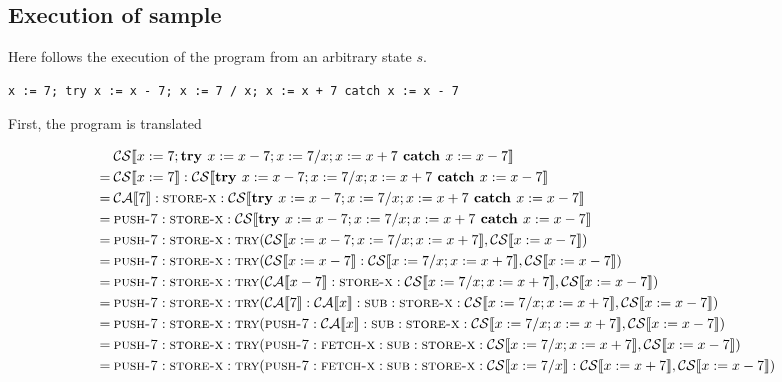 \documentclass[11pt,oneside,a4paper]{article}
\newenvironment{changemargin}[2]{%
\begin{list}{}{%
\setlength{\topsep}{0pt}%
\setlength{\leftmargin}{#1}%
\setlength{\listparindent}{\parindent}%
\setlength{\itemindent}{\parindent}%
\setlength{\parsep}{\parskip}%
}%
\item[]}{\end{list}}
\newcommand{\SExp}[2]{\mathcal{#1}\llbracket #2 \rrbracket}
\newcommand{\AMIns}[1]{\textsc{#1}}
\begin{document}
\subsection*{Execution of sample}
Here follows the execution of the program from an arbitrary 
state \(s\).
\begin{verbatim}
x := 7; try x := x - 7; x := 7 / x; x := x + 7 catch x := x - 7
\end{verbatim}
First, the program is translated
\begin{changemargin}{-2.9cm}{\rightmargin}
\begin{align*}
&\SExp{CS}{x := 7; \textbf{try } x := x - 7; x := 7 / x; x := x + 7 
\textbf{ catch } x := x - 7}  \\
=\: &\SExp{CS}{x := 7}:\SExp{CS}{\textbf{try } x := x - 7; x := 7 / x; x := x + 7 
\textbf{ catch } x := x - 7} \\
=\: &\SExp{CA}{7}:\AMIns{store-x}:\SExp{CS}{\textbf{try } x := x - 7; x := 7 / x; x := x + 7 
\textbf{ catch } x := x - 7} \\
=\: &\AMIns{push-7}:\AMIns{store-x}:\SExp{CS}{\textbf{try } x := x - 7; x := 7 / x; x := x + 7 
\textbf{ catch } x := x - 7}  \\
=\: &\AMIns{push-7}:\AMIns{store-x}:
\AMIns{try}(\SExp{CS}{x := x - 7; x := 7 / x; x := x + 7}, 
\SExp{CS}{x := x - 7}) \\
=\: &\AMIns{push-7}:\AMIns{store-x}:
\AMIns{try}(\SExp{CS}{x := x - 7}:\SExp{CS}{x := 7 / x; x := x + 7},
\SExp{CS}{x := x - 7}) \\
=\: &\AMIns{push-7}:\AMIns{store-x}:
\AMIns{try}(\SExp{CA}{x - 7}:\AMIns{store-x}:\SExp{CS}{x := 7 / x; x := x + 7},
\SExp{CS}{x := x - 7}) \\
=\: &\AMIns{push-7}:\AMIns{store-x}:
\AMIns{try}(\SExp{CA}{7}:\SExp{CA}{x}:\AMIns{sub}:\AMIns{store-x}:\SExp{CS}{x := 7 / x; x := x + 7},
\SExp{CS}{x := x - 7}) \\
=\: &\AMIns{push-7}:\AMIns{store-x}:
\AMIns{try}(\AMIns{push-7}:\SExp{CA}{x}:\AMIns{sub}:\AMIns{store-x}:\SExp{CS}{x := 7 / x; x := x + 7},
\SExp{CS}{x := x - 7}) \\
=\: &\AMIns{push-7}:\AMIns{store-x}:
\AMIns{try}(\AMIns{push-7}:\AMIns{fetch-x}:\AMIns{sub}:\AMIns{store-x}:\SExp{CS}{x := 7 / x; x := x + 7},
\SExp{CS}{x := x - 7}) \\
=\: &\AMIns{push-7}:\AMIns{store-x}:
\AMIns{try}(\AMIns{push-7}:\AMIns{fetch-x}:\AMIns{sub}:\AMIns{store-x}:\SExp{CS}{x
:= 7 / x}:\SExp{CS}{x := x + 7},
\SExp{CS}{x := x - 7}) \\

\end{align*}
\end{changemargin}
\end{document}
